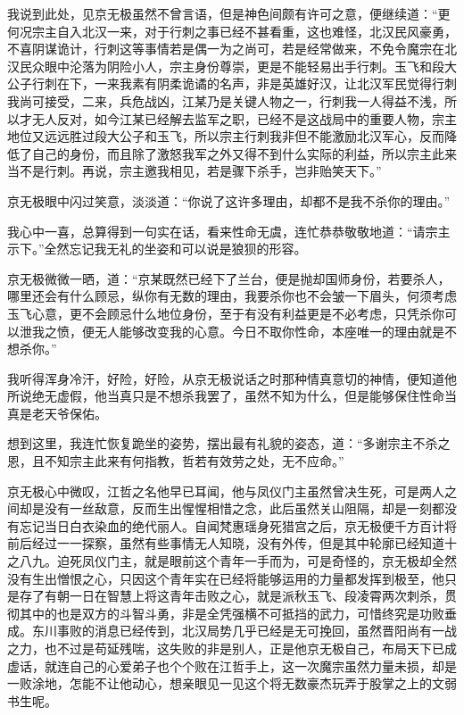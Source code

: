 我说到此处，见京无极虽然不曾言语，但是神色间颇有许可之意，便继续道：“更何况宗主自入北汉一来，对于行刺之事已经不甚看重，这也难怪，北汉民风豪勇，不喜阴谋诡计，行刺这等事情若是偶一为之尚可，若是经常做来，不免令魔宗在北汉民众眼中沦落为阴险小人，宗主身份尊崇，更是不能轻易出手行刺。玉飞和段大公子行刺在下，一来我素有阴柔诡谲的名声，非是英雄好汉，让北汉军民觉得行刺我尚可接受，二来，兵危战凶，江某乃是关键人物之一，行刺我一人得益不浅，所以才无人反对，如今江某已经解去监军之职，已经不是这战局中的重要人物，宗主地位又远远胜过段大公子和玉飞，所以宗主行刺我非但不能激励北汉军心，反而降低了自己的身份，而且除了激怒我军之外又得不到什么实际的利益，所以宗主此来当不是行刺。再说，宗主邀我相见，若是骤下杀手，岂非贻笑天下。”

京无极眼中闪过笑意，淡淡道：“你说了这许多理由，却都不是我不杀你的理由。”

我心中一喜，总算得到一句实在话，看来性命无虞，连忙恭恭敬敬地道：“请宗主示下。”全然忘记我无礼的坐姿和可以说是狼狈的形容。

京无极微微一晒，道：“京某既然已经下了兰台，便是抛却国师身份，若要杀人，哪里还会有什么顾忌，纵你有无数的理由，我要杀你也不会皱一下眉头，何须考虑玉飞心意，更不会顾忌什么地位身份，至于有没有利益更是不必考虑，只凭杀你可以泄我之愤，便无人能够改变我的心意。今日不取你性命，本座唯一的理由就是不想杀你。”

我听得浑身冷汗，好险，好险，从京无极说话之时那种情真意切的神情，便知道他所说绝无虚假，他当真只是不想杀我罢了，虽然不知为什么，但是能够保住性命当真是老天爷保佑。

想到这里，我连忙恢复跪坐的姿势，摆出最有礼貌的姿态，道：“多谢宗主不杀之恩，且不知宗主此来有何指教，哲若有效劳之处，无不应命。”

京无极心中微叹，江哲之名他早已耳闻，他与凤仪门主虽然曾决生死，可是两人之间却是没有一丝敌意，反而生出惺惺相惜之念，此后虽然关山阻隔，却是一刻都没有忘记当日白衣染血的绝代丽人。自闻梵惠瑶身死猎宫之后，京无极便千方百计将前后经过一一探察，虽然有些事情无人知晓，没有外传，但是其中轮廓已经知道十之八九。迫死凤仪门主，就是眼前这个青年一手而为，可是奇怪的，京无极却全然没有生出憎恨之心，只因这个青年实在已经将能够运用的力量都发挥到极至，他只是存了有朝一日在智慧上将这青年击败之心，就是派秋玉飞、段凌霄两次刺杀，贯彻其中的也是双方的斗智斗勇，非是全凭强横不可抵挡的武力，可惜终究是功败垂成。东川事败的消息已经传到，北汉局势几乎已经是无可挽回，虽然晋阳尚有一战之力，也不过是苟延残喘，这失败的非是别人，正是他京无极自己，布局天下已成虚话，就连自己的心爱弟子也个个败在江哲手上，这一次魔宗虽然力量未损，却是一败涂地，怎能不让他动心，想亲眼见一见这个将无数豪杰玩弄于股掌之上的文弱书生呢。

